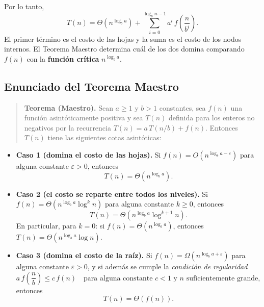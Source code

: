 \documentclass{article}
\begin{document}
        Por lo tanto,
        \[
        T(n) = \Theta\!\left(n^{\log_b a}\right)
            + \sum_{i=0}^{\log_b n - 1} a^i\, f\!\left(\frac{n}{b^i}\right).
        \]
        El primer término es el costo de las hojas y la suma es el costo de los nodos
        internos. El Teorema Maestro determina cuál de los dos domina comparando
        $f(n)$ con la \textbf{función crítica} $n^{\log_b a}$.
        
        \subsection{Enunciado del Teorema Maestro}
        
        \begin{quote}
        \textbf{Teorema (Maestro).} Sean $a \geq 1$ y $b > 1$ constantes, sea $f(n)$
        una función asintóticamente positiva y sea $T(n)$ definida para los enteros no
        negativos por la recurrencia $T(n) = a\,T(n/b) + f(n)$. Entonces $T(n)$ tiene
        las siguientes cotas asintóticas:
        \end{quote}
        
        \begin{itemize}
        \item \textbf{Caso 1 (domina el costo de las hojas).} Si
                $f(n) = O\!\left(n^{\log_b a - \varepsilon}\right)$ para alguna
                constante $\varepsilon > 0$, entonces
                \[
                T(n) = \Theta\!\left(n^{\log_b a}\right).
                \]
        
        \item \textbf{Caso 2 (el costo se reparte entre todos los niveles).} Si
                $f(n) = \Theta\!\left(n^{\log_b a}\log^{k} n\right)$ para alguna
                constante $k \geq 0$, entonces
                \[
                T(n) = \Theta\!\left(n^{\log_b a}\log^{k+1} n\right).
                \]
                En particular, para $k = 0$: si
                $f(n) = \Theta\!\left(n^{\log_b a}\right)$, entonces
                $T(n) = \Theta\!\left(n^{\log_b a}\log n\right)$.
        
        \item \textbf{Caso 3 (domina el costo de la raíz).} Si
                $f(n) = \Omega\!\left(n^{\log_b a + \varepsilon}\right)$ para alguna
                constante $\varepsilon > 0$, y si además se cumple la
                \emph{condición de regularidad}
                \[
                a\,f\!\left(\frac{n}{b}\right) \leq c\,f(n)
                \quad \text{para alguna constante } c < 1
                \text{ y } n \text{ suficientemente grande},
                \]
                entonces
                \[
                T(n) = \Theta\!\left(f(n)\right).
                \]
        \end{itemize}
        
\end{document}
